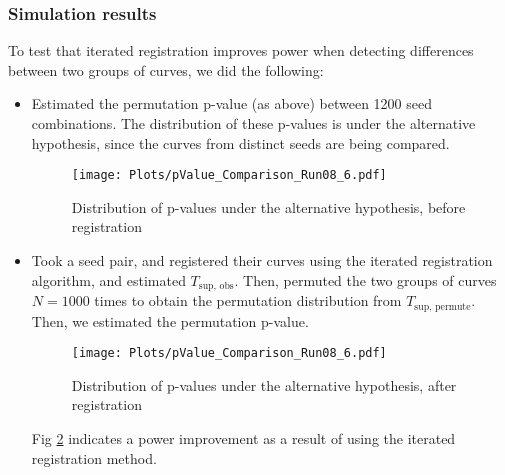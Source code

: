 \subsubsection*{Simulation results}
To test that iterated registration improves power when detecting differences between two groups of curves, we did the following:
\begin{itemize}
\item Estimated the permutation p-value (as above) between 1200 seed combinations. The distribution of these p-values is under the alternative hypothesis, since the curves from distinct seeds are being compared.
\begin{figure}[H]
\begin{center}
\texttt{[image: Plots/pValue\_Comparison\_Run08\_6.pdf]}
\end{center}
\caption{Distribution of p-values under the alternative hypothesis, before registration}
\label{fig:BeforeRegist}
\end{figure}

\item Took a seed pair, and registered their curves using the iterated registration algorithm, and estimated $T_{\text{sup, obs}}$. Then, permuted the two groups of curves $N = 1000$ times to obtain the permutation distribution from  $T_{\text{sup, permute}}$. Then, we estimated the permutation p-value. 
\begin{figure}[H]
\begin{center}
\texttt{[image: Plots/pValue\_Comparison\_Run08\_6.pdf]}
\end{center}
\caption{Distribution of p-values under the alternative hypothesis, after registration}
\label{fig:AfterRegist}
\end{figure}

Fig \ref{fig:AfterRegist} indicates a power improvement as a result of using the iterated registration method. 

\end{itemize} 


